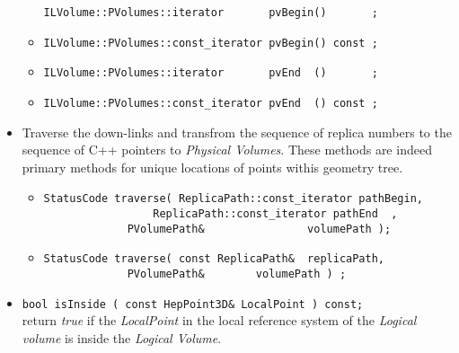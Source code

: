 \begin{itemize}
\begin{itemize}
\verb+ILVolume::PVolumes::iterator       pvBegin()       ;+
\item 
\verb+ILVolume::PVolumes::const_iterator pvBegin() const ;+
\item
\verb+ILVolume::PVolumes::iterator       pvEnd  ()       ;+ 
\item
\verb+ILVolume::PVolumes::const_iterator pvEnd  () const ;+ 
\end{itemize}   
\item Traverse the down-links and transfrom the sequence of replica numbers to the sequence 
of C++ pointers to {\it Physical Volumes}. These methods are indeed primary methods for unique 
locations of points withis geometry tree. 
\begin{itemize}  
\item 
\begin{verbatim}
StatusCode traverse( ReplicaPath::const_iterator pathBegin,
	             ReplicaPath::const_iterator pathEnd  ,
		     PVolumePath&                volumePath );
\end{verbatim}
  \item
\begin{verbatim} 
StatusCode traverse( const ReplicaPath&  replicaPath,
		     PVolumePath&        volumePath ) ;
\end{verbatim}
\end{itemize}
\item 
\verb+bool isInside ( const HepPoint3D& LocalPoint ) const;+
\\ return {\it true } if the {\it LocalPoint} in the local reference system of 
the {\it Logical volume} is inside the {\it Logical Volume}. 
 	

\end{itemize}
